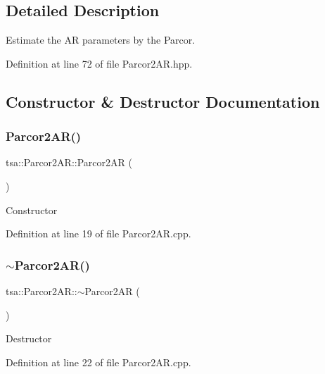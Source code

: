 \subsection{Detailed Description}
Estimate the AR parameters by the Parcor. 

Definition at line 72 of file Parcor2\+A\+R.\+hpp.



\subsection{Constructor \& Destructor Documentation}
\mbox{\label{classtsa_1_1_parcor2_a_r_a071a1e9ef52185df08d6889937bf4a15}} 
\subsubsection{\texorpdfstring{Parcor2\+A\+R()}{Parcor2AR()}}
{\footnotesize\ttfamily tsa\+::\+Parcor2\+A\+R\+::\+Parcor2\+AR (\begin{DoxyParamCaption}{ }\end{DoxyParamCaption})}

Constructor 

Definition at line 19 of file Parcor2\+A\+R.\+cpp.

\mbox{\label{classtsa_1_1_parcor2_a_r_a048e923396810067505a8a18ca95ec3a}} 
\subsubsection{\texorpdfstring{$\sim$\+Parcor2\+A\+R()}{~Parcor2AR()}}
{\footnotesize\ttfamily tsa\+::\+Parcor2\+A\+R\+::$\sim$\+Parcor2\+AR (\begin{DoxyParamCaption}{ }\end{DoxyParamCaption})\hspace{0.3cm}{\ttfamily [virtual]}}

Destructor 

Definition at line 22 of file Parcor2\+A\+R.\+cpp.



